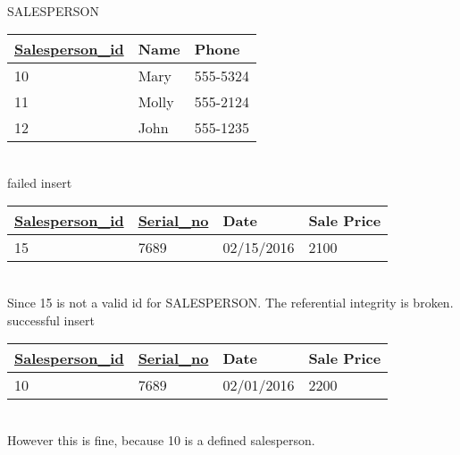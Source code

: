 \documentclass[a4paper,10pt]{article}
\begin{document}
\\ 
\bigskip
SALESPERSON
\begin{tabular}{|l|l|l|}
	\hline
	\underline{Salesperson\_id} & Name & Phone \\ \hline
	10 & Mary & 555-5324 \\ \hline
	11 & Molly & 555-2124 \\ \hline
	12 & John & 555-1235 \\ \hline

\end{tabular} 
\\
\bigskip
failed insert
\begin{tabular}{|l|l|l|l|}
	\hline
	\underline{Salesperson\_id} & \underline{Serial\_no} & Date & Sale Price \\ \hline
	15 & 7689 & 02/15/2016 & 2100 \\ \hline

\end{tabular}
\\
Since 15 is not a valid id for SALESPERSON. The referential integrity is broken.
\\
\bigskip
successful insert
\begin{tabular}{|l|l|l|l|}
	\hline
	\underline{Salesperson\_id} & \underline{Serial\_no} & Date & Sale Price \\ \hline
	10 & 7689 & 02/01/2016 & 2200 \\ \hline

\end{tabular}
\\
However this is fine, because 10 is a defined salesperson. 
\end{document}

